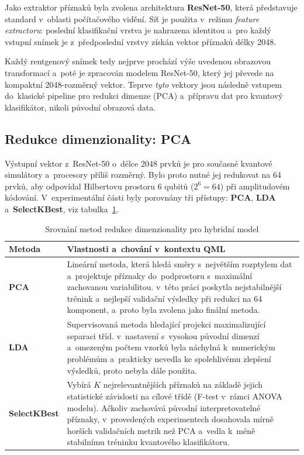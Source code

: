 \documentclass[12pt, a4paper]{report}
\begin{document}
Jako extraktor příznaků byla zvolena architektura \textbf{ResNet-50}, která představuje standard v~oblasti počítačového vidění. Síť je použita v~režimu \textit{feature extractoru}: poslední klasifikační vrstva je nahrazena identitou a~pro každý vstupní snímek je z~předposlední vrstvy získán vektor příznaků délky 2048.

Každý rentgenový snímek tedy nejprve prochází výše uvedenou obrazovou transformací a~poté je zpracován modelem ResNet-50, který jej převede na kompaktní 2048-rozměrný vektor. Teprve \emph{tyto} vektory jsou následně vstupem do~klasické pipeline pro redukci dimenze (PCA) a~přípravu dat pro kvantový klasifikátor, nikoli původní obrazová data.


\subsection{Redukce dimenzionality: PCA}

Výstupní vektor z~ResNet-50 o~délce 2048 prvků je pro současné kvantové simulátory a~procesory příliš rozměrný. 
Bylo proto nutné jej redukovat na 64 prvků, aby odpovídal Hilbertovu prostoru 6 qubitů (\(2^{6} = 64\)) při amplitudovém kódování.
V~experimentální části byly porovnány tři přístupy: \textbf{PCA}, \textbf{LDA} a~\textbf{SelectKBest}, viz tabulka~\ref{tab:redukce_dim}.

\begin{table}[H]
    \centering
    \caption{Srovnání metod redukce dimenzionality pro hybridní model}
    \label{tab:redukce_dim}
    \begin{tabular}{|l|p{8cm}|}
        \hline
        \textbf{Metoda} & \textbf{Vlastnosti a~chování v~kontextu QML} \\
        \hline
        \textbf{PCA} & Lineární metoda, která hledá směry s~největším rozptylem dat a~projektuje příznaky do~podprostoru s~maximální zachovanou variabilitou. v~této práci poskytla nejstabilnější trénink a~nejlepší validační výsledky při redukci na 64 komponent, a~proto byla zvolena jako finální metoda. \\
        \hline
        \textbf{LDA} & Supervisovaná metoda hledající projekci maximalizující separaci tříd. v~nastavení s~vysokou původní dimenzí a~omezeným počtem vzorků byla náchylná k~numerickým problémům a~prakticky nevedla ke spolehlivému zlepšení výsledků, proto nebyla dále použita. \\
        \hline
        \textbf{SelectKBest} & Vybírá \(K\) nejrelevantnějších příznaků na základě jejich statistické závislosti na cílové třídě (F-test v~rámci ANOVA modelu). Ačkoliv zachovává původní interpretovatelné příznaky, v~provedených experimentech dosahovala mírně horších validačních metrik než PCA a~vedla k~méně stabilnímu tréninku kvantového klasifikátoru. \\
        \hline
\end{tabular}
\end{table}
\end{document}
